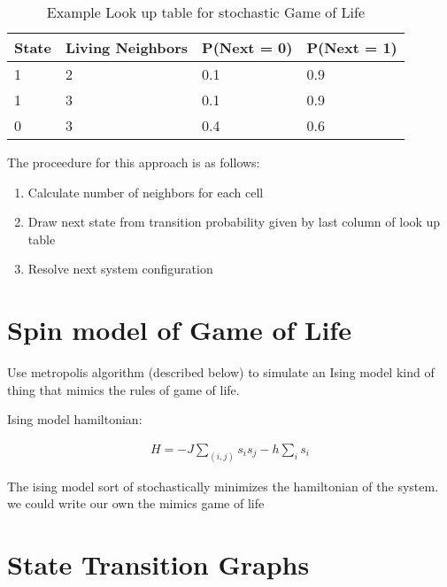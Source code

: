 \documentclass[12pt]{article}
\begin{document}
\begin{table}[h]
\centering
\caption{Example Look up table for stochastic Game of Life}
    \begin{tabular}{|l|l|l|l|} 
    \hline
    State & Living Neighbors & P(Next = 0) & P(Next = 1)  \\ 
    \hline
    1     & 2                & 0.1         & 0.9          \\ 
    \hline
    1     & 3                & 0.1         & 0.9          \\ 
    \hline
    0     & 3                & 0.4         & 0.6          \\
    \hline
    \end{tabular}
\end{table}

The proceedure for this approach is as follows:
\begin{enumerate}
    \item Calculate number of neighbors for each cell
    \item Draw next state from transition probability given by last column of
    look up table
    \item Resolve next system configuration
\end{enumerate}

\section{Spin model of Game of Life}

Use metropolis algorithm (described below) to simulate an Ising model kind of
thing that mimics the rules of game of life.

Ising model hamiltonian:

\begin{align}
    H = -J \sum_{(i,j)} s_i s_j - h \sum_i s_i
\end{align}

The ising model sort of stochastically minimizes the hamiltonian of the system.
we could write our own the mimics game of life

\section{State Transition Graphs}

\begin{figure}
    \centering
    \begin{subfigure}{0.4\textwidth}
        \centering
        
    \end{subfigure}
\end{figure}

\printbibliography
\end{document}
